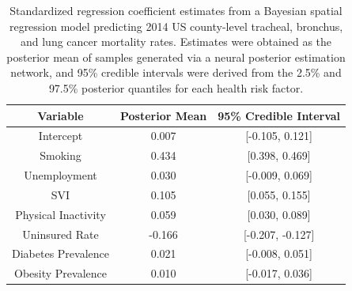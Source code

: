 \begin{table}[ht]
\centering
\begin{tabular}{ccc}
  \toprule
Variable & Posterior Mean & 95\% Credible Interval \\ 
  \midrule
Intercept & 0.007 & [-0.105, 0.121] \\ 
  Smoking & 0.434 & [0.398, 0.469] \\ 
  Unemployment & 0.030 & [-0.009, 0.069] \\ 
  SVI & 0.105 & [0.055, 0.155] \\ 
  Physical Inactivity & 0.059 & [0.030, 0.089] \\ 
  Uninsured Rate & -0.166 & [-0.207, -0.127] \\ 
  Diabetes Prevalence & 0.021 & [-0.008, 0.051] \\ 
  Obesity Prevalence & 0.010 & [-0.017, 0.036] \\ 
   \bottomrule
\end{tabular}
\caption{Standardized regression coefficient estimates from a Bayesian spatial regression model predicting 2014 US county-level tracheal, bronchus, and lung cancer mortality rates. Estimates were obtained as the posterior mean of samples generated via a neural posterior estimation network, and 95\% credible intervals were derived from the 2.5\% and 97.5\% posterior quantiles for each health risk factor.} 
\label{tab:beta_summary}
\end{table}

